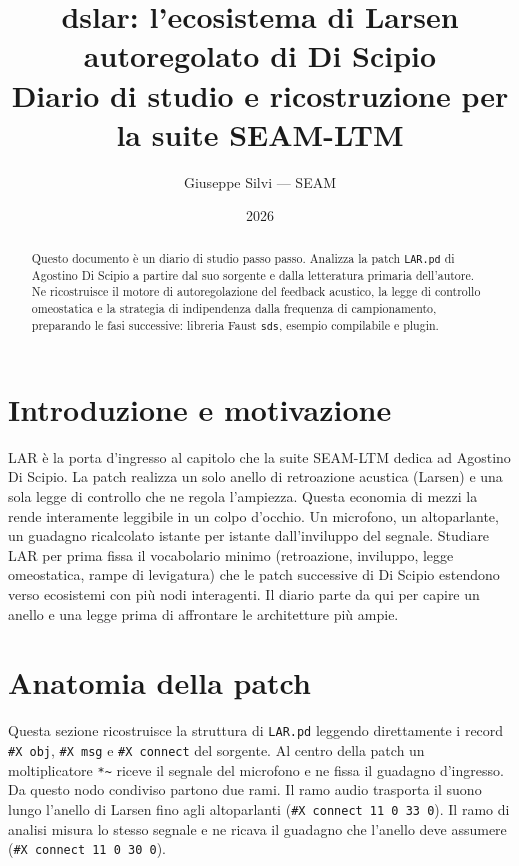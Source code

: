 \documentclass[11pt,a4paper]{article}
\title{dslar: l'ecosistema di Larsen autoregolato di Di Scipio\\\large Diario di studio e ricostruzione per la suite SEAM-LTM}
\author{Giuseppe Silvi --- SEAM}
\date{2026}
\begin{document}
\maketitle
\begin{abstract}
Questo documento è un diario di studio passo passo.
Analizza la patch \texttt{LAR.pd} di Agostino Di Scipio a partire dal suo sorgente e dalla letteratura primaria dell'autore.
Ne ricostruisce il motore di autoregolazione del feedback acustico, la legge di controllo omeostatica e la strategia di indipendenza dalla frequenza di campionamento, preparando le fasi successive: libreria Faust \texttt{sds}, esempio compilabile e plugin.
\end{abstract}
\tableofcontents

\section{Introduzione e motivazione}\label{sec:intro}
LAR è la porta d'ingresso al capitolo che la suite SEAM-LTM dedica ad Agostino Di Scipio.
La patch realizza un solo anello di retroazione acustica (Larsen) e una sola legge di controllo che ne regola l'ampiezza.
Questa economia di mezzi la rende interamente leggibile in un colpo d'occhio.
Un microfono, un altoparlante, un guadagno ricalcolato istante per istante dall'inviluppo del segnale.
Studiare LAR per prima fissa il vocabolario minimo (retroazione, inviluppo, legge omeostatica, rampe di levigatura) che le patch successive di Di Scipio estendono verso ecosistemi con più nodi interagenti.
Il diario parte da qui per capire un anello e una legge prima di affrontare le architetture più ampie.

\section{Anatomia della patch}\label{sec:anatomia}
Questa sezione ricostruisce la struttura di \texttt{LAR.pd} leggendo direttamente i record \texttt{\#X obj}, \texttt{\#X msg} e \texttt{\#X connect} del sorgente.
Al centro della patch un moltiplicatore \texttt{*\textasciitilde{}} riceve il segnale del microfono e ne fissa il guadagno d'ingresso.
Da questo nodo condiviso partono due rami.
Il ramo audio trasporta il suono lungo l'anello di Larsen fino agli altoparlanti (\texttt{\#X connect 11 0 33 0}).
Il ramo di analisi misura lo stesso segnale e ne ricava il guadagno che l'anello deve assumere (\texttt{\#X connect 11 0 30 0}).
\end{document}
